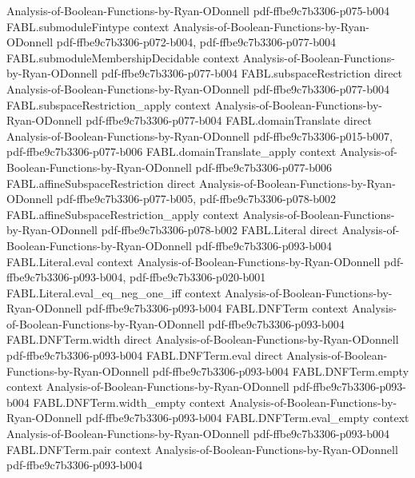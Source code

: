 \begin{theorem}
  {Analysis-of-Boolean-Functions-by-Ryan-ODonnell}
  {pdf-ffbe9c7b3306-p075-b004}
\proofstep
  {FABL.submoduleFintype}
  {context}
  {Analysis-of-Boolean-Functions-by-Ryan-ODonnell}
  {pdf-ffbe9c7b3306-p072-b004,
    pdf-ffbe9c7b3306-p077-b004}
\proofstep
  {FABL.submoduleMembershipDecidable}
  {context}
  {Analysis-of-Boolean-Functions-by-Ryan-ODonnell}
  {pdf-ffbe9c7b3306-p077-b004}
\proofstep
  {FABL.subspaceRestriction}
  {direct}
  {Analysis-of-Boolean-Functions-by-Ryan-ODonnell}
  {pdf-ffbe9c7b3306-p077-b004}
\proofstep
  {FABL.subspaceRestriction_apply}
  {context}
  {Analysis-of-Boolean-Functions-by-Ryan-ODonnell}
  {pdf-ffbe9c7b3306-p077-b004}
\proofstep
  {FABL.domainTranslate}
  {direct}
  {Analysis-of-Boolean-Functions-by-Ryan-ODonnell}
  {pdf-ffbe9c7b3306-p015-b007,
    pdf-ffbe9c7b3306-p077-b006}
\proofstep
  {FABL.domainTranslate_apply}
  {context}
  {Analysis-of-Boolean-Functions-by-Ryan-ODonnell}
  {pdf-ffbe9c7b3306-p077-b006}
\proofstep
  {FABL.affineSubspaceRestriction}
  {direct}
  {Analysis-of-Boolean-Functions-by-Ryan-ODonnell}
  {pdf-ffbe9c7b3306-p077-b005,
    pdf-ffbe9c7b3306-p078-b002}
\proofstep
  {FABL.affineSubspaceRestriction_apply}
  {context}
  {Analysis-of-Boolean-Functions-by-Ryan-ODonnell}
  {pdf-ffbe9c7b3306-p078-b002}
\proofstep
  {FABL.Literal}
  {direct}
  {Analysis-of-Boolean-Functions-by-Ryan-ODonnell}
  {pdf-ffbe9c7b3306-p093-b004}
\proofstep
  {FABL.Literal.eval}
  {context}
  {Analysis-of-Boolean-Functions-by-Ryan-ODonnell}
  {pdf-ffbe9c7b3306-p093-b004,
    pdf-ffbe9c7b3306-p020-b001}
\proofstep
  {FABL.Literal.eval_eq_neg_one_iff}
  {context}
  {Analysis-of-Boolean-Functions-by-Ryan-ODonnell}
  {pdf-ffbe9c7b3306-p093-b004}
\proofstep
  {FABL.DNFTerm}
  {context}
  {Analysis-of-Boolean-Functions-by-Ryan-ODonnell}
  {pdf-ffbe9c7b3306-p093-b004}
\proofstep
  {FABL.DNFTerm.width}
  {direct}
  {Analysis-of-Boolean-Functions-by-Ryan-ODonnell}
  {pdf-ffbe9c7b3306-p093-b004}
\proofstep
  {FABL.DNFTerm.eval}
  {direct}
  {Analysis-of-Boolean-Functions-by-Ryan-ODonnell}
  {pdf-ffbe9c7b3306-p093-b004}
\proofstep
  {FABL.DNFTerm.empty}
  {context}
  {Analysis-of-Boolean-Functions-by-Ryan-ODonnell}
  {pdf-ffbe9c7b3306-p093-b004}
\proofstep
  {FABL.DNFTerm.width_empty}
  {context}
  {Analysis-of-Boolean-Functions-by-Ryan-ODonnell}
  {pdf-ffbe9c7b3306-p093-b004}
\proofstep
  {FABL.DNFTerm.eval_empty}
  {context}
  {Analysis-of-Boolean-Functions-by-Ryan-ODonnell}
  {pdf-ffbe9c7b3306-p093-b004}
\proofstep
  {FABL.DNFTerm.pair}
  {context}
  {Analysis-of-Boolean-Functions-by-Ryan-ODonnell}
  {pdf-ffbe9c7b3306-p093-b004}
\proofstep

\end{theorem}
